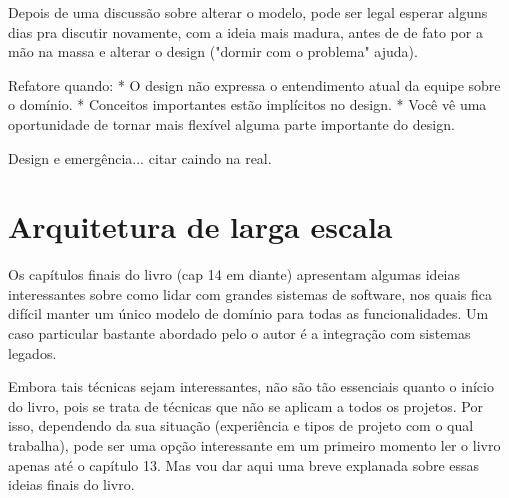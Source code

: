 \documentclass[a4paper, 12pt]{article}
\begin{document}
Depois de uma discussão sobre alterar o modelo, pode ser legal esperar alguns dias pra discutir novamente, com a ideia mais madura, antes de de fato por a mão na massa e alterar o design ("dormir com o problema" ajuda).

Refatore quando:
* O design não expressa o entendimento atual da equipe sobre o domínio.
* Conceitos importantes estão implícitos no design.
* Você vê uma oportunidade de tornar mais flexível alguma parte importante do design.

Design e emergência... citar caindo na real.

\section{Arquitetura de larga escala}

Os capítulos finais do livro (cap 14 em diante) apresentam algumas ideias interessantes sobre como lidar com grandes sistemas de software, nos quais fica difícil manter um único modelo de domínio para todas as funcionalidades. Um caso particular bastante abordado pelo o autor é a integração com sistemas legados.

Embora tais técnicas sejam interessantes, não são tão essenciais quanto o início do livro, pois se trata de técnicas que não se aplicam a todos os projetos. Por isso, dependendo da sua situação (experiência e tipos de projeto com o qual trabalha), pode ser uma opção interessante em um primeiro momento ler o livro apenas até o capítulo 13. Mas vou dar aqui uma breve explanada sobre essas ideias finais do livro.





  
\end{document}
